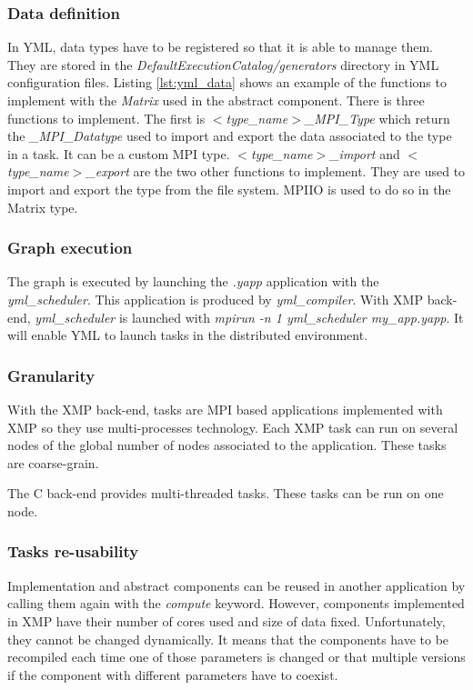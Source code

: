\subsubsection{Data definition}
In YML, data types have to be registered so that it is able to manage them.
They are stored in the \textit{DefaultExecutionCatalog/generators} directory in YML configuration files.
Listing \ref{lst:yml_data} shows an example of the functions to implement with the \textit{Matrix} used in the abstract component.
There is three functions to implement.
The first is \textit{$<$type\_name$>$\_MPI\_Type} which return the \textit{\_MPI\_Datatype} used to import and export the data associated to the type in a task.
It can be a custom MPI type.
\textit{$<$type\_name$>$\_import} and \textit{$<$type\_name$>$\_export} are the two other functions to implement.
They are used to import and export the type from the file system.
MPIIO is used to do so in the Matrix type.

\begin{figure}

\end{figure}

\subsubsection{Graph execution}
The graph is executed by launching the \textit{.yapp} application with the \textit{yml\_scheduler}.
This application is produced by \textit{yml\_compiler}.
With XMP back-end, \textit{yml\_scheduler} is launched with \textit{mpirun -n 1 yml\_scheduler my\_app.yapp}.
It will enable YML to launch tasks in the distributed environment.

\subsubsection{Granularity}
With the XMP back-end, tasks are MPI based applications implemented with XMP so they use multi-processes technology.
Each XMP task can run on several nodes of the global number of nodes associated to the application.
These tasks are coarse-grain.

The C back-end provides multi-threaded tasks.
These tasks can be run on one node.

\subsubsection{Tasks re-usability}
Implementation and abstract components can be reused in another application by calling them again with the \textit{compute} keyword.
However, components implemented in XMP have their number of cores used and size of data fixed.
Unfortunately, they cannot be changed dynamically.
It means that the components have to be recompiled each time one of those parameters is changed or that multiple versions if the component with different parameters have to coexist.


